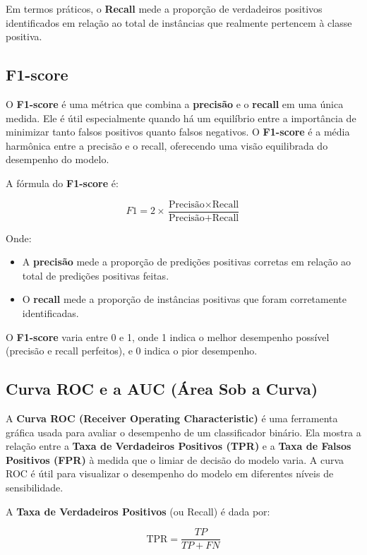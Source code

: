 \documentclass[conference]{IEEEtran}
\begin{document}
Em termos práticos, o \textbf{Recall} mede a proporção de verdadeiros positivos identificados em relação ao total de instâncias que realmente pertencem à classe positiva.

\subsection{F1-score}

O \textbf{F1-score} é uma métrica que combina a \textbf{precisão} e o \textbf{recall} em uma única medida. Ele é útil especialmente quando há um equilíbrio entre a importância de minimizar tanto falsos positivos quanto falsos negativos. O \textbf{F1-score} é a média harmônica entre a precisão e o recall, oferecendo uma visão equilibrada do desempenho do modelo.

A fórmula do \textbf{F1-score} é:

\[
F1 = 2 \times \frac{\text{Precisão} \times \text{Recall}}{\text{Precisão} + \text{Recall}}
\]

Onde:

\begin{itemize}
	\item A \textbf{precisão} mede a proporção de predições positivas corretas em relação ao total de predições positivas feitas.
	\item O \textbf{recall} mede a proporção de instâncias positivas que foram corretamente identificadas.
\end{itemize}

O \textbf{F1-score} varia entre 0 e 1, onde 1 indica o melhor desempenho possível (precisão e recall perfeitos), e 0 indica o pior desempenho.

\subsection{Curva ROC e a AUC (Área Sob a Curva)}

A \textbf{Curva ROC (Receiver Operating Characteristic)} é uma ferramenta gráfica usada para avaliar o desempenho de um classificador binário. Ela mostra a relação entre a \textbf{Taxa de Verdadeiros Positivos (TPR)} e a \textbf{Taxa de Falsos Positivos (FPR)} à medida que o limiar de decisão do modelo varia. A curva ROC é útil para visualizar o desempenho do modelo em diferentes níveis de sensibilidade.

A \textbf{Taxa de Verdadeiros Positivos} (ou Recall) é dada por:

\[
\text{TPR} = \frac{TP}{TP + FN}
\]
\end{document}
